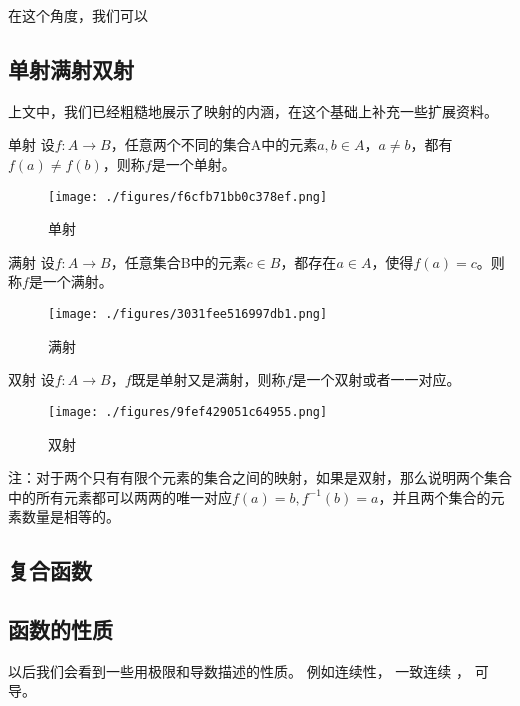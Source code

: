 在这个角度，我们可以


\subsection{单射满射双射}

上文中，我们已经粗糙地展示了映射的内涵，在这个基础上补充一些扩展资料。

\begin{definition}{单射}
设$f:A\to{B}$，任意两个不同的集合A中的元素$a,b\in{A}$，$a\not={b}$，都有$f(a)\not={f(b)}$，则称$f$是一个单射。
\end{definition}

\begin{figure}[ht]
\centering
\texttt{[image: ./figures/f6cfb71bb0c378ef.png]}
\caption{单射}\label{fig_functi_2}
\end{figure}

\begin{definition}{满射}
设$f:A\to{B}$，任意集合B中的元素$c\in{B}$，都存在$a\in{A}$，使得$f(a)=c$。则称$f$是一个满射。
\end{definition}

\begin{figure}[ht]
\centering
\texttt{[image: ./figures/3031fee516997db1.png]}
\caption{满射} \label{fig_functi_3}
\end{figure}


\begin{definition}{双射}
设$f:A\to{B}$，$f$既是单射又是满射，则称$f$是一个双射或者一一对应。
\end{definition}

\begin{figure}[ht]
\centering
\texttt{[image: ./figures/9fef429051c64955.png]}
\caption{双射} \label{fig_functi_4}
\end{figure}

注：对于两个只有有限个元素的集合之间的映射，如果是双射，那么说明两个集合中的所有元素都可以两两的唯一对应$f(a)=b,f^{-1}(b)=a$，并且两个集合的元素数量是相等的。


\subsection{复合函数}


\subsection{函数的性质}
以后我们会看到一些用极限和导数描述的性质。 例如连续性， 一致连续 %
， 可导。
